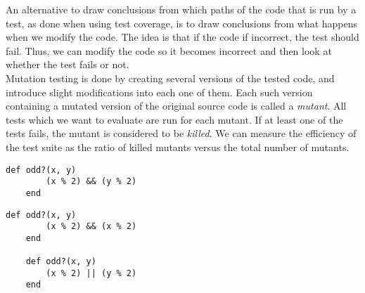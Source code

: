 An alternative to draw conclusions from which paths of the code that is
run by a test, as done when using test coverage, is to draw conclusions
from what happens when we modify the code. The idea is that if the code
if incorrect, the test should fail. Thus, we can modify the code so it
becomes incorrect and then look at whether the test fails or not.\\

Mutation testing is done by creating several versions of the tested
code, and introduce slight modifications into each one of them. Each
such version containing a mutated version of the original source code is
called a \emph{mutant}. All tests which we want to evaluate are run for
each mutant. If at least one of the tests fails, the mutant is
considered to be \emph{killed}. We can measure the efficiency of the
test suite as the ratio of killed mutants versus the total number of
mutants.\cite{wiki:mutation}\\


\begin{lstlisting}[caption=Example of a piece of code before mutation,
                   label=lst:mutation_before, float=t]
    def odd?(x, y)
        (x % 2) && (y % 2)
    end
\end{lstlisting}


\begin{lstlisting}[caption=Two mutated versions of \ref{lst:mutation_before},
                   label=lst:mutant_1, float=t]
    def odd?(x, y)
        (x % 2) && (x % 2)
    end

    def odd?(x, y)
        (x % 2) || (y % 2)
    end
\end{lstlisting}

